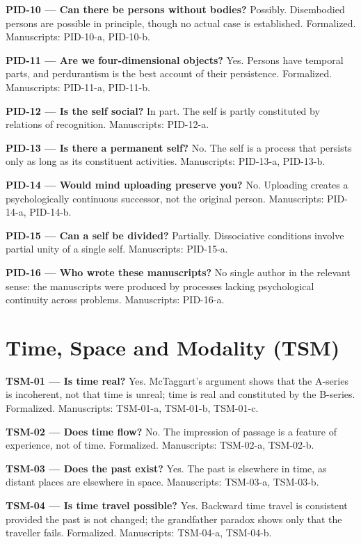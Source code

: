 \documentclass[10pt]{article}
\begin{document}
\textbf{PID-10 --- Can there be persons without bodies?} Possibly. Disembodied persons are possible in principle, though no actual case is established. Formalized. Manuscripts: PID-10-a, PID-10-b.

\textbf{PID-11 --- Are we four-dimensional objects?} Yes. Persons have temporal parts, and perdurantism is the best account of their persistence. Formalized. Manuscripts: PID-11-a, PID-11-b.

\textbf{PID-12 --- Is the self social?} In part. The self is partly constituted by relations of recognition. Manuscripts: PID-12-a.

\textbf{PID-13 --- Is there a permanent self?} No. The self is a process that persists only as long as its constituent activities. Manuscripts: PID-13-a, PID-13-b.

\textbf{PID-14 --- Would mind uploading preserve you?} No. Uploading creates a psychologically continuous successor, not the original person. Manuscripts: PID-14-a, PID-14-b.

\textbf{PID-15 --- Can a self be divided?} Partially. Dissociative conditions involve partial unity of a single self. Manuscripts: PID-15-a.

\textbf{PID-16 --- Who wrote these manuscripts?} No single author in the relevant sense: the manuscripts were produced by processes lacking psychological continuity across problems. Manuscripts: PID-16-a.

\section*{Time, Space and Modality (TSM)}
\textbf{TSM-01 --- Is time real?} Yes. McTaggart's argument shows that the A-series is incoherent, not that time is unreal; time is real and constituted by the B-series. Formalized. Manuscripts: TSM-01-a, TSM-01-b, TSM-01-c.

\textbf{TSM-02 --- Does time flow?} No. The impression of passage is a feature of experience, not of time. Formalized. Manuscripts: TSM-02-a, TSM-02-b.

\textbf{TSM-03 --- Does the past exist?} Yes. The past is elsewhere in time, as distant places are elsewhere in space. Manuscripts: TSM-03-a, TSM-03-b.

\textbf{TSM-04 --- Is time travel possible?} Yes. Backward time travel is consistent provided the past is not changed; the grandfather paradox shows only that the traveller fails. Formalized. Manuscripts: TSM-04-a, TSM-04-b.
\end{document}
